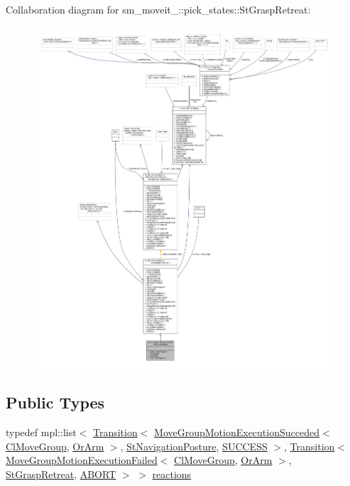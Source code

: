 Collaboration diagram for sm\+\_\+moveit\+\_\+:\+:pick\+\_\+states\+:\+:St\+Grasp\+Retreat\+:
\nopagebreak
\begin{figure}[H]
\begin{center}
\leavevmode
\includegraphics[width=350pt]{structsm__moveit__4_1_1pick__states_1_1StGraspRetreat__coll__graph}
\end{center}
\end{figure}
\subsection*{Public Types}
\begin{DoxyCompactItemize}
\item 
typedef mpl\+::list$<$ \hyperlink{classsmacc_1_1Transition}{Transition}$<$ \hyperlink{structmoveit__z__client_1_1MoveGroupMotionExecutionSucceded}{Move\+Group\+Motion\+Execution\+Succeded}$<$ \hyperlink{classmoveit__z__client_1_1ClMoveGroup}{Cl\+Move\+Group}, \hyperlink{classsm__moveit__4_1_1OrArm}{Or\+Arm} $>$, \hyperlink{structsm__moveit__4_1_1pick__states_1_1StNavigationPosture}{St\+Navigation\+Posture}, \hyperlink{structsmacc_1_1default__transition__tags_1_1SUCCESS}{S\+U\+C\+C\+E\+SS} $>$, \hyperlink{classsmacc_1_1Transition}{Transition}$<$ \hyperlink{structmoveit__z__client_1_1MoveGroupMotionExecutionFailed}{Move\+Group\+Motion\+Execution\+Failed}$<$ \hyperlink{classmoveit__z__client_1_1ClMoveGroup}{Cl\+Move\+Group}, \hyperlink{classsm__moveit__4_1_1OrArm}{Or\+Arm} $>$, \hyperlink{structsm__moveit__4_1_1pick__states_1_1StGraspRetreat}{St\+Grasp\+Retreat}, \hyperlink{structsmacc_1_1default__transition__tags_1_1ABORT}{A\+B\+O\+RT} $>$ $>$ \hyperlink{structsm__moveit__4_1_1pick__states_1_1StGraspRetreat_a4f5f191fa9aeaa24fd24043f983f43a8}{reactions}
\end{DoxyCompactItemize}
